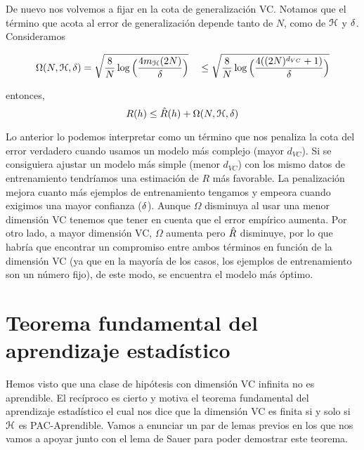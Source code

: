     De nuevo nos volvemos a fijar en la cota de generalización VC. Notamos que el término que acota al error de generalización depende tanto de $N$, como de $\mathcal{H}$ y $\delta$. Consideramos
    
    \begin{equation}
        \Omega(N,\mathcal{H},\delta) = \sqrt{\frac{8}{N}\log\Big(\frac{4m_{\mathcal{H}}(2N)}{\delta}\Big)} \quad \leq \sqrt{\frac{8}{N} \log \Big( \frac{4((2N)^{d_{VC}} + 1)}{\delta} \Big)} 
    \end{equation}
    
    \noindent entonces,
    \begin{equation}
        R(h) \leq \hat{R}(h) + \Omega(N,\mathcal{H},\delta)
    \end{equation}
    
    \noindent Lo anterior lo podemos interpretar como un término que nos penaliza la cota del error verdadero cuando usamos un modelo más complejo (mayor $d_{VC}$). Si se consiguiera ajustar un modelo más simple (menor $d_{VC}$) con los mismo datos de entrenamiento tendríamos una estimación de $R$ más favorable. La penalización mejora cuanto más ejemplos de entrenamiento tengamos y empeora cuando exigimos una mayor confianza ($\delta$). Aunque $\Omega$ disminuya al usar una menor dimensión VC tenemos que tener en cuenta que el error empírico aumenta. Por otro lado, a mayor dimensión VC, $\Omega$ aumenta pero $\hat{R}$ disminuye, por lo que habría que encontrar un compromiso entre ambos términos en función de la dimensión VC (ya que en la mayoría de los casos, los ejemplos de entrenamiento son un número fijo), de este modo, se encuentra el modelo más óptimo. \\ 
    

    
\section{Teorema fundamental del aprendizaje estadístico}
    
    Hemos visto que una clase de hipótesis con dimensión VC infinita no es aprendible. El recíproco es cierto y motiva el teorema fundamental del aprendizaje estadístico el cual nos dice que la dimensión VC es finita si y solo si $\mathcal{H}$ es PAC-Aprendible. Vamos a enunciar un par de lemas previos en los que nos vamos a apoyar junto con el lema de Sauer para poder demostrar este teorema. \\
    
